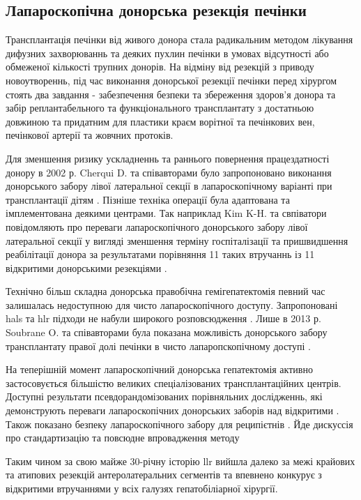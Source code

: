 \begin{refsection}
\subsection{Лапароскопічна донорська резекція печінки} 

Трансплантація печінки від живого донора стала радикальним методом лікування дифузних захворюваннь та деяких пухлин печінки в умовах відсутності або обмеженої кількості трупних донорів. На відміну від резекцій з приводу новоутвореннь, під час виконання донорської резекції печінки перед хірургом стоять два завдання -  забезпечення безпеки та збереження здоров'я донора та забір реплантабельного та функціонального трансплантату з достатньою довжиною та придатним для пластики краєм ворітної та печінкових вен, печінкової артерії та жовчних протоків. 

Для зменшення ризику ускладненнь та раннього повернення працездатності донору в 2002 р. Cherqui D. та співавторами було запропоновано виконання донорського забору лівої латеральної секції в лапароскопічному варіанті при трансплантації дітям \cite{Cherqui2002a}. Пізніше техніка операції була адаптована та імплементована деякими центрами. Так наприклад Kim K-H. та свпіватори повідомляють про переваги лапароскопічного донорського забору лівої латеральної секції у вигляді зменшення терміну госпіталізації та пришвидшення реабілітації донора за результатами порівняння 11 таких втручаннь із 11 відкритими донорськими резекціями \cite{Kim2011}. 

Технічно більш складна донорська правобічна гемігепатектомія певний час залишалась недоступною для чисто лапароскопічного доступу. Запропоновані \acrshort{hals} та \acrshort{hlr} підходи не набули широкого розповсюдження \cite{Koffron2006, Thenappan2011, Lin2013}. Лише в 2013 р. Soubrane O. та співавторами була показана можливість донорського забору трансплантату правої долі печінки в чисто лапаропскопічному доступі \cite{Soubrane2013}. 

На теперішній момент лапароскопічний донорська гепатектомія активно застосовується більшістю великих спеціалізованих трансплантаційних центрів. Доступні результати псевдорандомізованих порівняльних дослідженнь, які демонструють переваги лапароскопічних донорських заборів над відкритими \cite{Broering2018, Park2019a}. Також показано безпеку лапароскопічного забору для реципієтнів \cite{Kwon2018a}. Йде дискуссія про стандартизацію та повсюдне впровадження методу \cite{Au2018, Samstein2018}

Таким чином за свою майже 30-річну історію \acrshort{llr} вийшла далеко за межі крайових та атипових резекцій антеролатеральних сегментів та впевнено конкурує з відкритими втручаннями у всіх галузях гепатобіліарної хірургії. 


\end{refsection}
